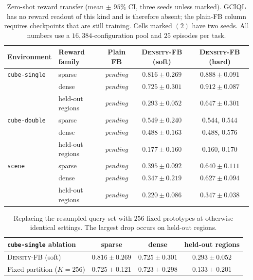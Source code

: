 \documentclass{article}
\newcommand{\DensityFB}{\textsc{Density-FB}}
\begin{document}
\begin{table}[h]
\centering
\small
\setlength{\tabcolsep}{4pt}
\begin{tabular}{llccc}
\toprule
Environment & Reward family & Plain FB & \DensityFB{} (soft) & \DensityFB{} (hard) \\
\midrule

\texttt{cube-single}
& sparse
& \emph{pending}
& $0.816 \pm 0.269$
& $\mathbf{0.888 \pm 0.091}$ \\

& dense
& \emph{pending}
& $0.725 \pm 0.301$
& $\mathbf{0.912 \pm 0.087}$ \\

& held-out regions
& \emph{pending}
& $0.293 \pm 0.052$
& $\mathbf{0.647 \pm 0.301}$ \\
\midrule

\texttt{cube-double}
& sparse
& \emph{pending}
& $0.549 \pm 0.240$
& $0.544$, $0.544$ \\

& dense
& \emph{pending}
& $0.488 \pm 0.163$
& $0.488$, $0.576$ \\

& held-out regions
& \emph{pending}
& $0.177 \pm 0.160$
& $0.160$, $0.170$ \\
\midrule

\texttt{scene}
& sparse
& \emph{pending}
& $0.395 \pm 0.092$
& $\mathbf{0.640 \pm 0.111}$ \\

& dense
& \emph{pending}
& $0.347 \pm 0.219$
& $\mathbf{0.627 \pm 0.094}$ \\

& held-out regions
& \emph{pending}
& $0.220 \pm 0.086$
& $\mathbf{0.347 \pm 0.038}$ \\
\bottomrule
\end{tabular}

\caption{
Zero-shot reward transfer
(mean $\pm$ $95\%$ CI, three seeds unless marked).
GCIQL has no reward readout of this kind and is therefore absent;
the plain-FB column requires checkpoints that are still training.
Cells marked $(2)$ have two seeds.
All numbers use a $16{,}384$-configuration pool and $25$ episodes per task.
}
\label{tab:zeroshot}
\end{table}

\begin{table}[h]
\centering
\small
\begin{tabular}{lccc}
\toprule
\texttt{cube-single} ablation
& sparse
& dense
& held-out regions \\
\midrule

\DensityFB{} (soft)
& $0.816 \pm 0.269$
& $0.725 \pm 0.301$
& $0.293 \pm 0.052$ \\

Fixed partition ($K{=}256$)
& $0.725 \pm 0.121$
& $0.723 \pm 0.298$
& $0.133 \pm 0.201$ \\
\bottomrule
\end{tabular}
\caption{
Replacing the resampled query set with $256$ fixed prototypes at otherwise identical settings.
The largest drop occurs on held-out regions.
}
\label{tab:partition}
\end{table}
\end{document}
